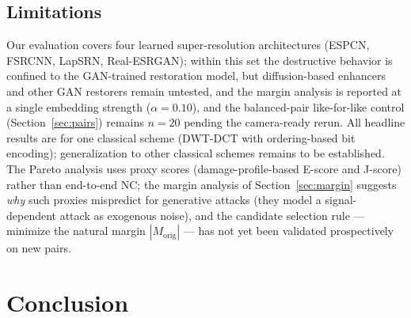 \documentclass[conference]{IEEEtran}
\begin{document}
\subsection{Limitations}
Our evaluation covers four learned super-resolution architectures
(ESPCN, FSRCNN, LapSRN, Real-ESRGAN); within this set the destructive
behavior is confined to the GAN-trained restoration model, but
diffusion-based enhancers and other GAN restorers remain untested, and
the margin analysis is reported at a single embedding strength
($\alpha=0.10$), and the balanced-pair like-for-like control
(Section~\ref{sec:pairs}) remains $n=20$ pending the camera-ready
rerun. All headline results are for one
classical scheme (DWT-DCT with ordering-based bit encoding);
generalization to other classical schemes remains to be established.
The Pareto analysis uses proxy scores (damage-profile-based E-score and
J-score) rather than end-to-end NC; the margin analysis of
Section~\ref{sec:margin} suggests \emph{why} such proxies mispredict
for generative attacks (they model a signal-dependent attack as
exogenous noise), and the candidate selection rule --- minimize the
natural margin $|M_{\mathrm{orig}}|$ --- has not yet been validated
prospectively on new pairs.

\section{Conclusion}
\label{sec:conclusion}
\end{document}
